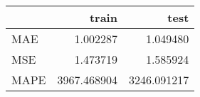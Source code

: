 \begin{tabular}{lrr}
\toprule
{} &        train &         test \\
\midrule
MAE  &     1.002287 &     1.049480 \\
MSE  &     1.473719 &     1.585924 \\
MAPE &  3967.468904 &  3246.091217 \\
\bottomrule
\end{tabular}
